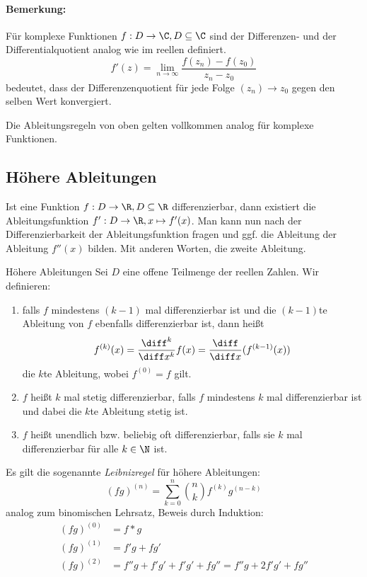 \paragraph{Bemerkung:}
Für komplexe Funktionen $f:D\rightarrow\C, D\subseteq\C$ sind der Differenzen- und der Differentialquotient analog wie im reellen definiert.
\begin{equation*}
	f'(z)=\lim\limits_{n\to\infty}\frac{f(z_n)-f(z_0)}{z_n-z_0}
\end{equation*}
bedeutet, dass der Differenzenquotient für jede Folge $(z_n)\to z_0$ gegen den selben Wert konvergiert.

Die Ableitungsregeln von oben gelten vollkommen analog für komplexe Funktionen.

\subsection{Höhere Ableitungen}
Ist eine Funktion $f:D\rightarrow\R, D\subseteq\R$ differenzierbar, dann existiert die Ableitungsfunktion $f':D\rightarrow\R,x\mapsto f'(x)$. Man kann nun nach der Differenzierbarkeit der Ableitungsfunktion fragen und ggf. die Ableitung der Ableitung $f''(x)$ bilden. Mit anderen Worten, die zweite Ableitung.

\begin{definition}{Höhere Ableitungen}
	Sei $D$ eine offene Teilmenge der reellen Zahlen. Wir definieren:
	\begin{enumerate}
		\item falls $f$ mindestens $(k-1)$ mal differenzierbar ist und die $(k-1)$te Ableitung von $f$ ebenfalls differenzierbar ist, dann heißt
		\begin{equation*}
			f^{(k)}(x)=\frac{\diff^k}{\diff x^k}f(x)=\frac{\diff}{\diff x}(f^{(k-1)}(x))
		\end{equation*}
		die $k$te Ableitung, wobei $f^{(0)}=f$ gilt.
		\item $f$ heißt $k$ mal stetig differenzierbar, falls $f$ mindestens $k$ mal differenzierbar ist und dabei die $k$te Ableitung stetig ist.
		\item $f$ heißt unendlich bzw. beliebig oft differenzierbar, falls sie $k$ mal differenzierbar für alle $k\in\N$ ist.
	\end{enumerate}
\end{definition}

Es gilt die sogenannte \emph{Leibnizregel} für höhere Ableitungen:
\begin{equation*}
	(fg)^{(n)}=\sum\limits_{k=0}^n \binom nk f^{(k)}g^{(n-k)}
\end{equation*}
analog zum binomischen Lehrsatz, Beweis durch Induktion:
\begin{align*}
	(fg)^{(0)}&=f*g\\
	(fg)^{(1)}&=f'g+fg'\\
	(fg)^{(2)}&=f''g+f'g'+f'g'+fg''=f''g+2f'g'+fg''
\end{align*}

